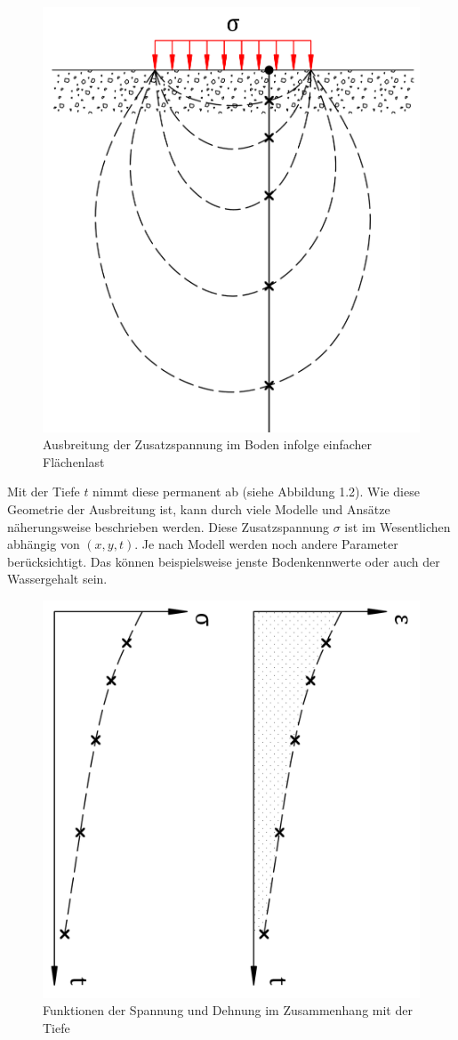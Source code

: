 \begin{figure}
	\centering
	\includegraphics[width=0.4\linewidth,keepaspectratio]{papers/spannung/Grafiken/Bild4.png}
	\caption{Ausbreitung der Zusatzspannung im Boden infolge einfacher Flächenlast}
	\label{fig:Bild4}
\end{figure}

Mit der Tiefe $t$ nimmt diese permanent ab (siehe Abbildung 1.2).
Wie diese Geometrie der Ausbreitung ist, kann durch viele Modelle und Ansätze näherungsweise beschrieben werden.
Diese Zusatzspannung $\sigma$ ist im Wesentlichen abhängig von $(x,y,t)$.
Je nach Modell werden noch andere Parameter berücksichtigt.
Das können beispielsweise jenste Bodenkennwerte oder auch der Wassergehalt sein.

\begin{figure}
	\centering
	\includegraphics[width=0.35\linewidth,keepaspectratio]{papers/spannung/Grafiken/Bild5.png}
	\caption{Funktionen der Spannung und Dehnung im Zusammenhang mit der Tiefe}
	\label{fig:Bild5}
\end{figure}

